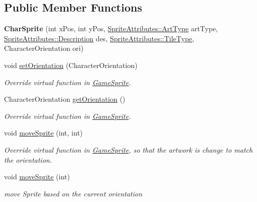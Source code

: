 \subsection*{Public Member Functions}
\begin{DoxyCompactItemize}
\item 
\mbox{\label{class_char_sprite_ab2fc7e388ec050c1fa842ae544a1abdc}} 
{\bfseries Char\+Sprite} (int x\+Pos, int y\+Pos, \mbox{\hyperlink{namespace_sprite_attributes_afb5447c311bc29f0ce8ddfd025c6e998}{Sprite\+Attributes\+::\+Art\+Type}} art\+Type, \mbox{\hyperlink{namespace_sprite_attributes_a3ece96d6288b14d53d84e2138392395c}{Sprite\+Attributes\+::\+Description}} des, \mbox{\hyperlink{namespace_sprite_attributes_a254503d1929a87fa82146c9b7d19c2df}{Sprite\+Attributes\+::\+Tile\+Type}}, Character\+Orientation ori)
\item 
\mbox{\label{class_char_sprite_aa1abdd6c5c23e4f9fc387c6366e614f4}} 
void \mbox{\hyperlink{class_char_sprite_aa1abdd6c5c23e4f9fc387c6366e614f4}{set\+Orientation}} (Character\+Orientation)
\begin{DoxyCompactList}\small\item\em Override virtual function in \mbox{\hyperlink{class_game_sprite}{Game\+Sprite}}. \end{DoxyCompactList}\item 
\mbox{\label{class_char_sprite_a90884802c77985e34839c8c65f31e130}} 
Character\+Orientation \mbox{\hyperlink{class_char_sprite_a90884802c77985e34839c8c65f31e130}{get\+Orientation}} ()
\begin{DoxyCompactList}\small\item\em Override virtual function in \mbox{\hyperlink{class_game_sprite}{Game\+Sprite}}. \end{DoxyCompactList}\item 
\mbox{\label{class_char_sprite_ac4d0cb62e37461baff3fa1aa31de5878}} 
void \mbox{\hyperlink{class_char_sprite_ac4d0cb62e37461baff3fa1aa31de5878}{move\+Sprite}} (int, int)
\begin{DoxyCompactList}\small\item\em Override virtual function in \mbox{\hyperlink{class_game_sprite}{Game\+Sprite}}, so that the artwork is change to match the orientation. \end{DoxyCompactList}\item 
\mbox{\label{class_char_sprite_a4e20c37553161593c1170f47021d431c}} 
void \mbox{\hyperlink{class_char_sprite_a4e20c37553161593c1170f47021d431c}{move\+Sprite}} (int)
\begin{DoxyCompactList}\small\item\em move Sprite based on the current orientation \end{DoxyCompactList}\end{DoxyCompactItemize}
